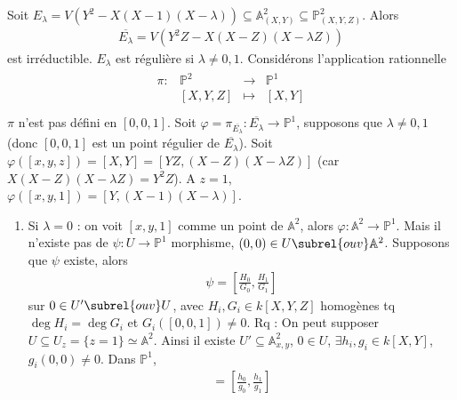             \begin{expl}
                Soit $E_\lambda = V(Y^2 - X(X - 1)(X - \lambda)) \subseteq \mathbb{A}^2_{(X,Y)} \subseteq \mathbb{P}^2_{(X,Y,Z)}$. Alors
                \begin{align*}
                    \overline{E_\lambda} = V(Y^2Z - X(X - Z)(X - \lambda Z))
                \end{align*}
                est irréductible. $E_\lambda$ est régulière si $\lambda \neq 0,1$. Considérons l'application rationnelle
                \begin{align*}
                    \begin{array}{cccc}
                        \pi : & \mathbb{P}^2 & \to & \mathbb{P}^1 \\
                        & [X,Y,Z] & \mapsto & [X,Y] \\
                    \end{array}
                \end{align*}
                $\pi$ n'est pas défini en $[0,0,1]$. Soit $\varphi = \pi_{\overline{E_\lambda}} : \overline{E_\lambda} \to \mathbb{P}^1$, supposons que $\lambda \neq 0,1$ (donc $[0,0,1]$ est un point régulier de $\overline{E_\lambda}$). Soit $\varphi([x,y,z]) = [X,Y] = [YZ, (X - Z)(X - \lambda Z)]$ (car $X(X - Z)(X - \lambda Z) = Y^2Z$). A $z = 1$, $\varphi([x,y,1]) = [Y, (X - 1)(X - \lambda)]$.
                \begin{enumerate}
                    \item Si $\lambda = 0$ : on voit $[x,y,1]$ comme un point de $\mathbb{A}^2$, alors $\varphi : \mathbb{A}^2 \to \mathbb{P}^1$. Mais il n'existe pas de $\psi : U \to \mathbb{P}^1$ morphisme, $(0,0) \in U \subrel{ouv} \mathbb{A}^2$. Supposons que $\psi$ existe, alors
                    \begin{align*}
                        \psi = \left[ \frac{H_0}{G_0}, \frac{H_1}{G_1} \right]
                    \end{align*}
                    sur $0 \in U' \subrel{ouv} U$, avec $H_i, G_i \in k[X,Y,Z]$ homogènes tq $\deg H_i = \deg G_i$ et $G_i([0,0,1]) \neq 0$. Rq : On peut supposer $U \subseteq U_z = \{z = 1\} \simeq \mathbb{A}^2$. Ainsi il existe $U' \subseteq \mathbb{A}^2_{x,y}$, $0 \in U$, $\exists h_i,g_i \in k[X,Y]$, $g_i(0,0) \neq 0$. Dans $\mathbb{P}^1$,
                    \begin{align*}
                        [X,Y] = \left[ \frac{h_0}{g_0}, \frac{h_1}{g_1} \right]
                    \end{align*}

\end{enumerate}
\end{expl}
